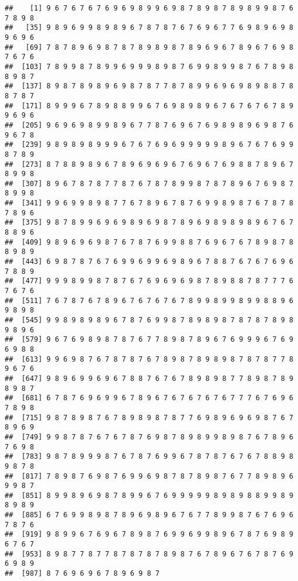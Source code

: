 \documentclass[]{article}
\begin{document}
\begin{verbatim}
##    [1] 9 6 7 6 7 6 7 6 9 6 9 8 9 9 6 9 8 7 8 9 8 7 8 9 8 9 9 8 7 6 7 8 9 8
##   [35] 9 8 9 6 9 9 8 9 8 9 6 7 8 7 8 7 6 7 6 9 6 7 7 6 9 8 9 6 9 8 9 6 9 6
##   [69] 7 8 7 8 9 6 9 8 7 8 7 8 9 8 9 8 7 8 9 6 9 6 7 8 9 6 7 6 9 8 7 6 7 6
##  [103] 7 8 9 9 8 7 8 9 9 6 9 9 9 8 9 8 7 6 9 9 8 9 9 8 7 6 7 8 9 8 8 9 8 7
##  [137] 8 9 8 7 8 9 8 9 6 9 8 7 8 7 7 8 7 8 9 9 6 9 6 9 8 9 8 8 7 8 8 7 8 7
##  [171] 8 9 9 9 6 7 8 9 8 8 9 9 6 7 6 9 8 9 8 9 6 7 6 7 6 7 6 7 8 9 9 6 9 6
##  [205] 9 6 9 6 9 8 9 9 8 9 6 7 7 8 7 6 9 6 7 6 9 8 9 8 9 6 9 8 7 6 9 6 7 8
##  [239] 9 8 9 8 9 8 9 9 9 6 7 6 7 6 9 6 9 9 9 9 9 8 9 6 7 6 7 6 9 9 8 7 8 9
##  [273] 8 7 8 8 9 8 9 6 7 8 9 6 9 6 9 6 7 6 9 6 7 6 9 8 8 7 8 9 6 7 8 9 9 8
##  [307] 8 9 6 7 8 7 8 7 7 8 7 6 7 8 7 8 9 9 8 7 8 7 8 9 6 7 6 9 8 7 8 9 9 8
##  [341] 9 9 6 9 9 8 9 8 7 7 6 7 8 9 6 7 8 7 6 9 9 8 9 8 7 6 7 8 7 8 7 8 9 6
##  [375] 9 8 7 8 9 9 6 9 6 9 8 9 6 9 8 7 8 9 6 9 8 9 8 9 8 9 6 7 6 7 8 8 9 6
##  [409] 9 8 9 6 9 6 9 8 7 6 7 8 7 6 9 9 8 8 7 6 9 6 7 6 7 8 9 8 7 8 8 9 8 9
##  [443] 6 9 8 7 8 7 6 7 6 9 9 6 9 9 6 9 8 9 6 7 8 8 7 6 7 6 7 6 9 6 7 8 8 9
##  [477] 9 9 9 8 9 9 8 7 8 7 6 7 6 9 6 9 6 9 8 7 8 9 8 8 7 8 7 7 7 6 7 6 7 6
##  [511] 7 6 7 8 7 6 7 8 9 6 7 6 7 6 7 6 7 8 9 9 8 9 9 8 9 9 8 8 9 6 9 8 9 8
##  [545] 9 9 8 9 8 9 8 9 6 7 8 7 6 9 9 8 7 8 9 8 9 8 7 8 7 8 7 8 9 8 9 8 9 6
##  [579] 9 6 7 6 9 8 9 8 7 8 7 6 7 7 8 9 8 7 8 9 6 7 6 9 9 9 6 7 6 9 6 9 8 8
##  [613] 9 9 6 9 8 7 6 7 8 7 8 7 6 7 8 9 8 7 8 9 8 9 8 7 8 7 8 7 7 8 9 6 7 6
##  [647] 9 8 9 6 9 9 6 9 6 7 8 8 7 6 7 6 7 8 9 8 9 8 7 7 8 9 8 7 8 9 8 9 8 7
##  [681] 6 7 8 7 6 9 6 9 9 6 7 8 9 6 7 6 7 6 7 6 7 6 7 7 7 6 7 6 9 6 7 8 9 8
##  [715] 9 8 7 8 9 8 7 6 7 8 9 8 9 8 7 8 7 7 6 9 8 9 6 9 6 9 8 7 6 7 8 9 6 9
##  [749] 9 9 8 7 8 7 6 7 6 7 8 7 6 9 8 7 8 9 8 9 9 8 9 8 7 6 7 8 9 6 7 6 9 8
##  [783] 9 8 7 8 9 9 9 8 7 6 7 8 7 6 9 9 6 7 8 7 8 7 6 7 6 7 8 8 9 8 9 8 7 8
##  [817] 7 8 9 8 7 6 9 8 7 6 9 9 6 9 8 7 8 7 8 9 8 7 6 7 7 8 9 8 9 6 9 9 8 7
##  [851] 8 9 9 8 9 6 9 8 7 8 9 9 6 7 6 9 9 9 9 9 8 9 8 9 8 8 9 9 8 9 8 9 8 9
##  [885] 6 7 6 9 9 8 9 8 7 8 9 6 9 8 9 6 7 6 7 7 8 9 9 8 7 6 7 6 9 6 7 8 7 6
##  [919] 9 8 9 9 6 7 6 9 6 7 8 9 8 7 6 9 9 6 9 9 8 9 6 7 8 7 6 9 8 9 6 7 6 7
##  [953] 8 9 8 7 7 8 7 7 8 7 8 7 8 7 8 9 8 7 6 7 8 9 6 7 6 7 8 7 6 9 6 9 8 9
##  [987] 8 7 6 9 6 9 6 7 8 9 6 9 8 7
\end{verbatim}
\end{document}
